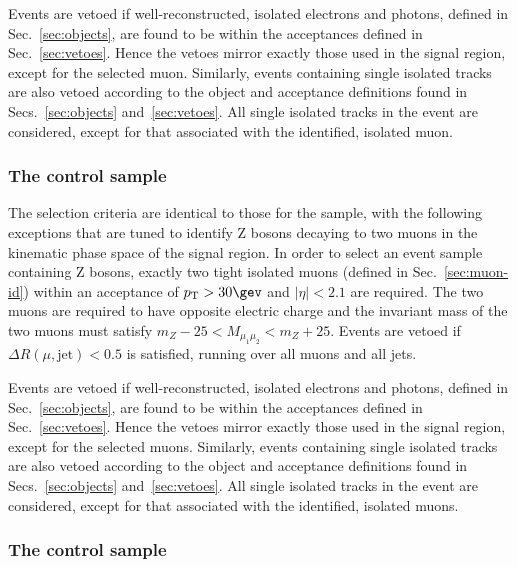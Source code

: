 Events are vetoed if well-reconstructed, isolated electrons and
photons, defined in Sec.~\ref{sec:objects}, are found to be within the
acceptances defined in Sec.~\ref{sec:vetoes}. Hence the vetoes mirror
exactly those used in the signal region, except for the selected
muon. Similarly, events containing single isolated tracks are also
vetoed according to the object and acceptance definitions found in
Secs.~\ref{sec:objects} and~\ref{sec:vetoes}. All single isolated
tracks in the event are considered, except for that associated with
the identified, isolated muon.

\subsubsection{The \texorpdfstring{\mmj}{di-muon plus jets} control sample}
\label{sec:mumucontrolSelection}

The selection criteria are identical to those for the \mj sample, with
the following exceptions that are tuned to identify Z bosons decaying
to two muons in the kinematic phase space of the signal region. 
In order to select an event sample containing Z bosons, exactly two
tight isolated muons (defined in Sec.~\ref{sec:muon-id}) within an acceptance of $\Pt > 30\gev$ and
$|\eta| < 2.1$ are required. The two muons are required to have opposite electric charge 
and the invariant mass of the two muons must satisfy $m_{Z} - 25 < M_{\mu_1\mu_2} < m_{Z} +25$. 
Events are vetoed if $\Delta R(\mu,\textrm{jet}) < 0.5$ is satisfied, running over all muons
and all jets. 

Events are vetoed if well-reconstructed, isolated electrons and
photons, defined in Sec.~\ref{sec:objects}, are found to be within the
acceptances defined in Sec.~\ref{sec:vetoes}. Hence the vetoes mirror
exactly those used in the signal region, except for the selected
muons. Similarly, events containing single isolated tracks are also
vetoed according to the object and acceptance definitions found in
Secs.~\ref{sec:objects} and~\ref{sec:vetoes}. All single isolated
tracks in the event are considered, except for that associated with
the identified, isolated muons.

\subsubsection{The \texorpdfstring{\gj}{photon plus jets} control sample}
\label{sec:photoncontrolSelection}

